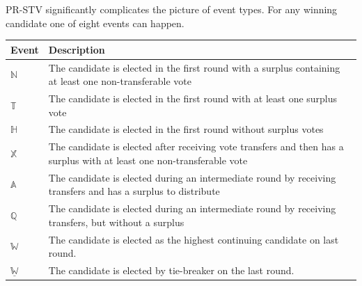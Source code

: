 \documentclass[runningheads,a4paper]{llncs}
\newcommand{\winner}{\ensuremath{\mathbb{W}}}
\newcommand{\quota}{\ensuremath{\mathbb{Q}}}
\newcommand{\quotawinnernontransferable}{\ensuremath{\mathbb{X}}}
\newcommand{\winnernontransferable}{\ensuremath{\mathbb{N}}}
\newcommand{\abovequotawinner}{\ensuremath{\mathbb{A}}}
\newcommand{\highwinner}{\ensuremath{\mathbb{H}}}
\newcommand{\surpluswinner}{\ensuremath{\mathbb{T}}}
\newcommand{\tiebreak}[1]{\ensuremath{\underline{#1}}}
\begin{document}
PR-STV significantly complicates the picture of event types.  For any
winning candidate one of eight events can happen.
\begin{center}
  \begin{longtable}{l|p{}}
    Event & Description \\
    \hline
    \winnernontransferable & The candidate is elected in the first round
    with a surplus containing at least one non-transferable vote \\
    \surpluswinner & The candidate is elected in the first round with at
    least one surplus vote \\
    \highwinner & The candidate is elected in the first round without
    surplus votes \\
    \quotawinnernontransferable & The candidate is elected after receiving
    vote transfers and then has a surplus with at least one
    non-transferable vote\\
    \abovequotawinner & The candidate is elected during an intermediate round by
    receiving transfers and has a surplus to distribute \\
    \quota & The candidate is elected during an intermediate round by
    receiving transfers, but without a surplus \\
    \winner & The candidate is elected as the highest continuing
    candidate on last round. \\
    \tiebreak{\winner} & The candidate is elected by tie-breaker on
    the last round. \\
  \end{longtable}
\end{center}
\end{document}
